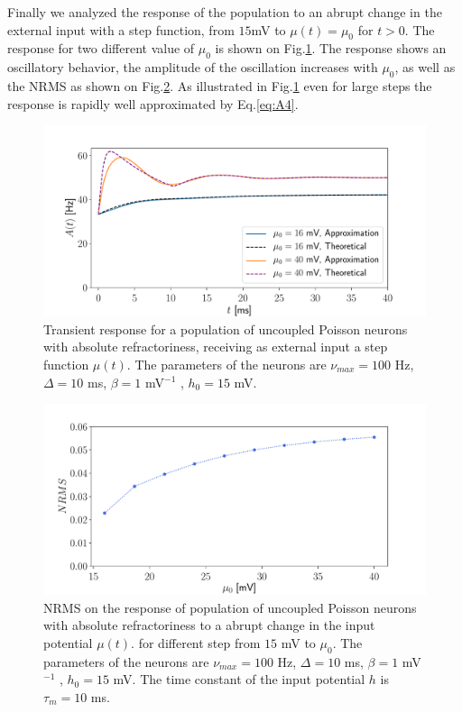 \documentclass[12pt,twoside]{report}
\begin{document}

Finally we analyzed the response of the population to an abrupt change in the external input with a step function, from $15$mV to $\mu(t)=\mu_0$ for $t>0$. The response for two different value of $\mu_0$ is shown on Fig.\ref{fig:Astep}. The response shows an oscillatory behavior, the amplitude of the oscillation increases with $\mu_0$, as well as the NRMS as shown on Fig.\ref{fig:NRMSstep}.  As illustrated in Fig.\ref{fig:Astep} even for large steps the response is rapidly well approximated by Eq.\eqref{eq:A4}.

\begin{figure}[h!]
	\centering
	\includegraphics[width=0.8\linewidth]{Astep.pdf}
	\caption{Transient response for a population of uncoupled Poisson neurons with absolute refractoriness, receiving as external input a step function $\mu(t)$. The parameters of the neurons are $\nu_{max}=100$ Hz, $\Delta=10$ ms, $\beta=1$ mV$^{-1}$ , $h_0=15$ mV. 
	}
	\label{fig:Astep}
\end{figure}

\begin{figure}[h!]
	\centering
	\includegraphics[width=0.8\linewidth]{NRMSstep.pdf}
	\caption{NRMS on the response of population of uncoupled Poisson neurons with absolute refractoriness to a abrupt change in the input potential $\mu(t)$. for different step from $15$ mV to $\mu_0$. The parameters of the neurons are $\nu_{max}=100$ Hz, $\Delta=10$ ms, $\beta=1$ mV$^{-1}$ , $h_0=15$ mV. The time constant of the input potential $h$ is $\tau_m=10$ ms.
	}
	\label{fig:NRMSstep}
\end{figure}
\end{document}
